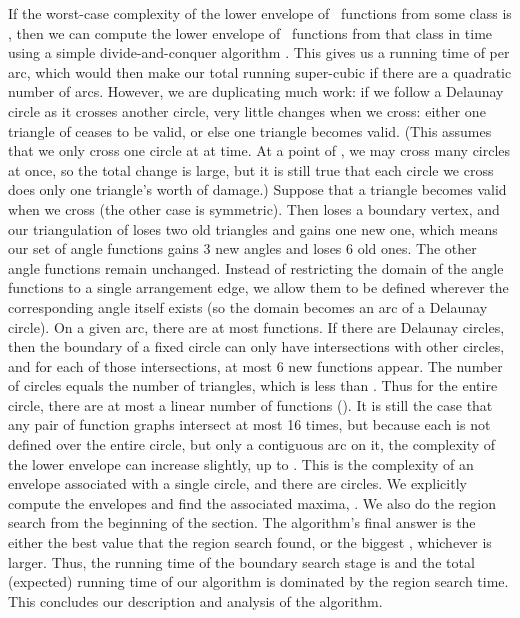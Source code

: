 \documentclass{cccg13}
\begin{document}
If the worst-case complexity of the lower envelope of ~functions from some class is , then we can compute the lower envelope of ~functions from that class in  time using a simple divide-and-conquer algorithm \cite[Theorem 6.1]{ds}.  This gives us a running time of  per arc, which would then make our total running super-cubic if there are a quadratic number of arcs.  However, we are duplicating much work: if we follow a Delaunay circle as it crosses another circle, very little changes when we cross: either one triangle of  ceases to be valid, or else one triangle becomes valid.  (This assumes that we only cross one circle at at time.  At a point of , we may cross many circles at once, so the total change is large, but it is still true that each circle we cross does only one triangle's worth of damage.)  Suppose that a triangle becomes valid when we cross (the other case is symmetric).  Then  loses a boundary vertex, and our triangulation of  loses two old triangles and gains one new one, which means our set of angle functions gains 3 new angles and loses 6 old ones.  The other angle functions remain unchanged.  Instead of restricting the domain of the angle functions to a single arrangement edge, we allow them to be defined wherever the corresponding angle itself exists (so the domain becomes an arc of a Delaunay circle).  On a given arc, there are at most  functions.  If there are  Delaunay circles, then the boundary of a fixed circle can only have  intersections with other circles, and for each of those intersections, at most 6 new functions appear.  The number of circles equals the number of triangles, which is less than .  Thus for the entire circle, there are at most a linear number of functions ().  It is still the case that any pair of function graphs intersect at most 16 times, but because each is not defined over the entire circle, but only a contiguous arc on it, the complexity of the lower envelope can increase slightly, up to  \cite{ds}.  This is the complexity of an envelope associated with a single circle, and there are  circles.  We explicitly compute the  envelopes and find the  associated maxima, .  We also do the region search from the beginning of the section.  The algorithm's final answer is the either the best value that the region search found, or the biggest , whichever is larger.  Thus, the running time of the boundary search stage is  and the total (expected) running time of our algorithm is dominated by the  region search time.  This concludes our description and analysis of the algorithm.
\end{document}
